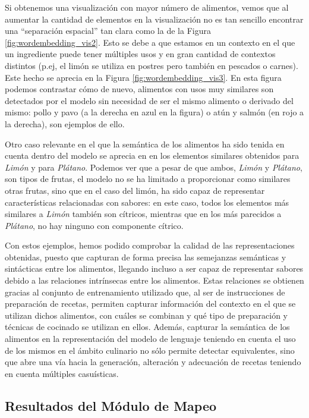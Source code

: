 Si obtenemos una visualización con mayor número de alimentos, vemos que al aumentar la cantidad de elementos en la visualización no es tan sencillo encontrar una ``separación espacial'' tan clara como la de la Figura \ref{fig:wordembedding_vis2}. Esto se debe a que estamos en un contexto en el que un ingrediente puede tener múltiples usos y en gran cantidad de contextos distintos (p.ej, el limón se utiliza en postres pero también en pescados o carnes). Este hecho se aprecia en la Figura \ref{fig:wordembedding_vis3}. En esta figura podemos contrastar cómo de nuevo, alimentos con usos muy similares son detectados por el modelo sin necesidad de ser el mismo alimento o derivado del mismo: pollo y pavo (a la derecha en azul en la figura) o atún y salmón (en rojo a la derecha), son ejemplos de ello.

Otro caso relevante en el que la semántica de los alimentos ha sido tenida en cuenta dentro del modelo se aprecia en en los elementos similares obtenidos para \textit{Limón} y para \textit{Plátano}. Podemos ver que a pesar de que ambos, \textit{Limón} y \textit{Plátano}, son tipos de frutas, el modelo no se ha limitado a proporcionar como similares otras frutas, sino que en el caso del limón, ha sido capaz de representar características relacionadas con sabores: en este caso, todos los elementos más similares a \textit{Limón} también son cítricos, mientras que en los más parecidos a \textit{Plátano}, no hay ninguno con componente cítrico.

Con estos ejemplos, hemos podido comprobar la calidad de las representaciones obtenidas, puesto que capturan de forma precisa las semejanzas semánticas y sintácticas entre los alimentos, llegando incluso a ser capaz de representar sabores debido a las relaciones intrínsecas entre los alimentos. Estas relaciones se obtienen gracias al conjunto de entrenamiento utilizado que, al ser de instrucciones de preparación de recetas, permiten capturar información del contexto en el que se utilizan dichos alimentos, con cuáles se combinan y qué tipo de preparación y técnicas de cocinado se utilizan en ellos. Además, capturar la semántica de los alimentos en la representación del modelo de lenguaje teniendo en cuenta el uso de los mismos en el ámbito culinario no sólo permite detectar equivalentes, sino que abre una vía hacia la generación, alteración y adecuación de recetas teniendo en cuenta múltiples casuísticas.



\subsection{Resultados del Módulo de Mapeo}\label{sec:res_mapeo}

